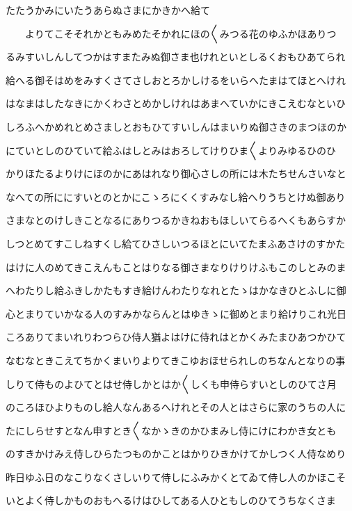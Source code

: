 \documentclass[a4paper,11pt,landscape]{ltjtarticle}
\begin{document}
たたうかみにいたうあらぬさまにかきかへ給て
\par\medskip
　　よりてこそそれかともみめたそかれにほの〱みつる花のゆふかほありつ
\par\medskip
るみすいしんしてつかはすまたみぬ御さま也けれといとしるくおもひあてられ
\par\medskip
給へる御そはめをみすくさてさしおとろかしけるをいらへたまはてほとへけれ
\par\medskip
はなまはしたなきにかくわさとめかしけれはあまへていかにきこえむなといひ
\par\medskip
しろふへかめれとめさましとおもひてすいしんはまいりぬ御さきのまつほのか
\par\medskip
にていとしのひていて給ふはしとみはおろしてけりひま〱よりみゆるひのひ
\par\medskip
かりほたるよりけにほのかにあはれなり御心さしの所には木たちせんさいなと
\par\medskip
なへての所ににすいとのとかにこゝろにくくすみなし給へりうちとけぬ御あり
\par\medskip
さまなとのけしきことなるにありつるかきねおもほしいてらるへくもあらすか
\par\medskip
しつとめてすこしねすくし給てひさしいつるほとにいてたまふあさけのすかた
\par\medskip
はけに人のめてきこえんもことはりなる御さまなりけりけふもこのしとみのま
\par\medskip
へわたりし給ふきしかたもすき給けんわたりなれとたゝはかなきひとふしに御
\par\medskip
心とまりていかなる人のすみかならんとはゆきゝに御めとまり給けりこれ光日
\par\medskip
ころありてまいれりわつらひ侍人猶よはけに侍れはとかくみたまひあつかひて
\par\medskip
なむなときこえてちかくまいりよりてきこゆおほせられしのちなんとなりの事
\par\medskip
しりて侍ものよひてとはせ侍しかとはか〱しくも申侍らすいとしのひてさ月
\par\medskip
のころほひよりものし給人なんあるへけれとその人とはさらに家のうちの人に
\par\medskip
たにしらせすとなん申すとき〱なかゝきのかひまみし侍にけにわかき女とも
\par\medskip
のすきかけみえ侍しひらたつものかことはかりひきかけてかしつく人侍なめり
\par\medskip
昨日ゆふ日のなこりなくさしいりて侍しにふみかくとてゐて侍し人のかほこそ
\par\medskip
いとよく侍しかものおもへるけはひしてある人ひともしのひてうちなくさま
\end{document}

